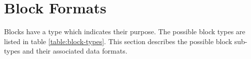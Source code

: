 \section{Block Formats} \label{sec:block-formats}

Blocks have a type which indicates their purpose. The possible block types are listed in table \ref{table:block-types}.
This section describes the possible block sub-types and their associated data formats.


